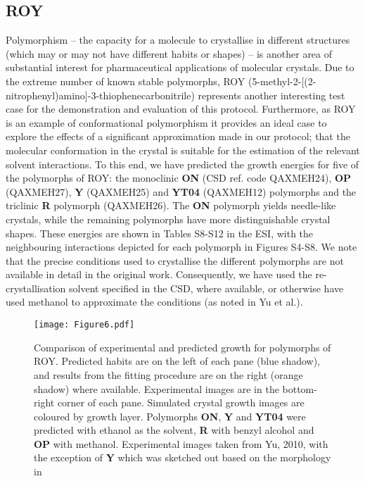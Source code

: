 \documentclass[twoside,twocolumn,9pt]{article}
\begin{document}
\subsection{ROY}
Polymorphism -- the capacity for a molecule to crystallise in different structures (which may or may not have different habits or shapes) -- is another area of substantial interest for pharmaceutical applications of molecular crystals. Due to the extreme number of known stable polymorphs, ROY (5-methyl-2-[(2-nitrophenyl)amino]-3-thiophenecarbonitrile)
represents another interesting test case for the demonstration and evaluation of this protocol.
Furthermore, as ROY is an example of conformational polymorphism it provides an ideal case to explore the effects of a significant approximation made in our protocol; that the molecular conformation in the crystal is suitable for the estimation of the relevant solvent interactions. To this end, we have predicted the growth energies for five of the polymorphs of ROY: the monoclinic \textbf{ON} 
(CSD ref. code QAXMEH24), \textbf{OP} (QAXMEH27), \textbf{Y} (QAXMEH25) and \textbf{YT04} (QAXMEH12) polymorphs and the triclinic \textbf{R} polymorph (QAXMEH26). The \textbf{ON} polymorph yields needle-like crystals, while the remaining polymorphs have more distinguishable crystal shapes. These energies are shown in Tables S8-S12 in the ESI, with the neighbouring interactions depicted for each polymorph in Figures S4-S8. We note that the precise conditions used to crystallise the different polymorphs are not available in detail in the original work. Consequently, we have used the re-crystallisation solvent specified in the CSD, where available, or otherwise have used methanol to approximate the conditions (as noted in Yu et al.\cite{Yu2010}).

\begin{figure*}
\centering
  \texttt{[image: Figure6.pdf]}
  \caption{Comparison of experimental and predicted growth for polymorphs of ROY. Predicted habits are on the left of each pane (blue shadow), and results from the fitting procedure are on the right (orange shadow) where available. Experimental images are in the bottom-right corner of each pane. Simulated crystal growth images are coloured by growth layer.
  Polymorphs \textbf{ON}, \textbf{Y} and \textbf{YT04} were predicted with ethanol as the solvent, \textbf{R} with benzyl alcohol and \textbf{OP} with methanol.
  Experimental images taken from Yu, 2010\cite{Yu2010}, with the exception of \textbf{Y} which was sketched out based on the morphology in \cite{Borchardt1998}}
  \label{fig:ROY}
\end{figure*}
\end{document}
